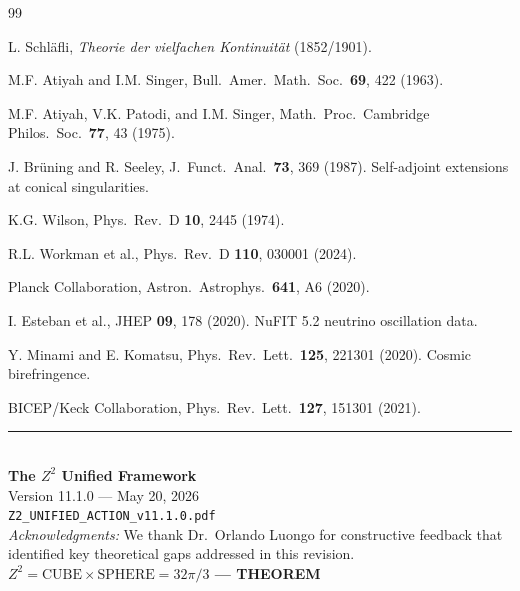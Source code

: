 \documentclass[11pt,a4paper]{article}
\theoremstyle{plain}
\theoremstyle{definition}
\theoremstyle{remark}
\begin{document}
\begin{thebibliography}{99}

 L. Schl\"afli, \emph{Theorie der vielfachen Kontinuit\"at} (1852/1901).

 M.F. Atiyah and I.M. Singer, Bull.\ Amer.\ Math.\ Soc.\ \textbf{69}, 422 (1963).

 M.F. Atiyah, V.K. Patodi, and I.M. Singer, Math.\ Proc.\ Cambridge Philos.\ Soc.\ \textbf{77}, 43 (1975).

 J. Br\"uning and R. Seeley, J.\ Funct.\ Anal.\ \textbf{73}, 369 (1987). Self-adjoint extensions at conical singularities.

 K.G. Wilson, Phys.\ Rev.\ D \textbf{10}, 2445 (1974).

 R.L. Workman et al., Phys.\ Rev.\ D \textbf{110}, 030001 (2024).

 Planck Collaboration, Astron.\ Astrophys.\ \textbf{641}, A6 (2020).

 I. Esteban et al., JHEP \textbf{09}, 178 (2020). NuFIT 5.2 neutrino oscillation data.

 Y. Minami and E. Komatsu, Phys.\ Rev.\ Lett.\ \textbf{125}, 221301 (2020). Cosmic birefringence.

 BICEP/Keck Collaboration, Phys.\ Rev.\ Lett.\ \textbf{127}, 151301 (2021).

\end{thebibliography}

\vspace{2cm}
\begin{center}
\rule{0.8\textwidth}{0.5pt}\\[0.5cm]
\textbf{The $Z^2$ Unified Framework}\\[0.3cm]
Version 11.1.0 --- May 20, 2026\\[0.3cm]
\texttt{Z2\_UNIFIED\_ACTION\_v11.1.0.pdf}\\[0.5cm]

\textit{Acknowledgments:} We thank Dr.\ Orlando Luongo for constructive feedback that identified key theoretical gaps addressed in this revision.\\[0.5cm]

\textbf{$Z^2 = \text{CUBE} \times \text{SPHERE} = 32\pi/3$ --- THEOREM}
\end{center}
\end{document}
